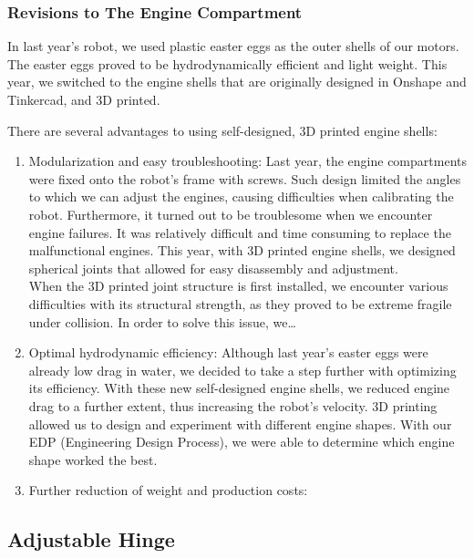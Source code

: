 \documentclass[11pt, oneside]{article}   	%
\begin{document}
\subsubsection*{Revisions to The Engine Compartment}
	In last year’s robot, we used plastic easter eggs as the outer shells of our motors. The easter eggs proved to be hydrodynamically efficient and light weight. This year, we switched to the engine shells that are originally designed in Onshape and Tinkercad, and 3D printed.
\begin{center}
	There are several advantages to using self-designed, 3D printed engine shells:
\end{center}
\begin{enumerate}
	\item Modularization and easy troubleshooting: Last year, the engine compartments were fixed onto the robot’s frame with screws. Such design limited the angles to which we can adjust the engines, causing difficulties when calibrating the robot. Furthermore, it turned out to be troublesome when we encounter engine failures. It was relatively difficult and time consuming to replace the malfunctional engines. This year, with 3D printed engine shells, we designed spherical joints that allowed for easy disassembly and adjustment.
	\\When the 3D printed joint structure is first installed, we encounter various difficulties with its structural strength, as they proved to be extreme fragile under collision. In order to solve this issue, we…

	\item Optimal hydrodynamic efficiency: Although last year’s easter eggs were already low drag in water, we decided to take a step further with optimizing its efficiency. With these new self-designed engine shells, we reduced engine drag to a further extent, thus increasing the robot’s velocity. 3D printing allowed us to design and experiment with different engine shapes. With our EDP (Engineering Design Process), we were able to determine which engine shape worked the best.

	\item Further reduction of weight and production costs:

\end{enumerate}

\subsection*{Adjustable Hinge}
\end{document}
